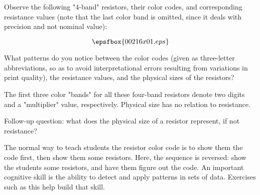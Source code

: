 

Observe the following "4-band" resistors, their color codes, and corresponding resistance values (note that the last color band is omitted, since it deals with precision and not nominal value):

$$\epsfbox{00216x01.eps}$$

What patterns do you notice between the color codes (given as three-letter abbreviations, so as to avoid interpretational errors resulting from variations in print quality), the resistance values, and the physical sizes of the resistors?
 






The first three color "bands" for all these four-band resistors denote two digits and a "multiplier" value, respectively.  Physical size has no relation to resistance.

\vskip 10pt

Follow-up question: what does the physical size of a resistor represent, if not resistance?







The normal way to teach students the resistor color code is to show them the code first, then show them some resistors.  Here, the sequence is reversed: show the students some resistors, and have them figure out the code.  An important cognitive skill is the ability to detect and apply patterns in sets of data.  Exercises such as this help build that skill.





